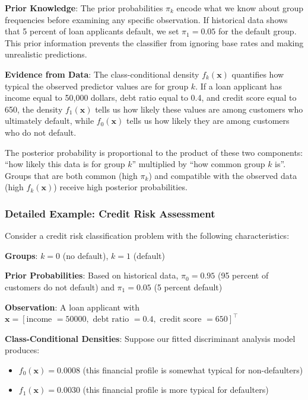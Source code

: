 \documentclass[
]{article}
\begin{document}
\textbf{Prior Knowledge}: The prior probabilities \(\pi_{k}\) encode
what we know about group frequencies before examining any specific
observation. If historical data shows that 5 percent of loan applicants
default, we set \(\pi_{1} = 0.05\) for the default group. This prior
information prevents the classifier from ignoring base rates and making
unrealistic predictions.

\textbf{Evidence from Data}: The class-conditional density
\(f_{k}\left( \mathbf{x} \right)\) quantifies how typical the observed
predictor values are for group \(k\). If a loan applicant has income
equal to 50,000 dollars, debt ratio equal to 0.4, and credit score equal
to 650, the density \(f_{1}\left( \mathbf{x} \right)\) tells us how
likely these values are among customers who ultimately default, while
\(f_{0}\left( \mathbf{x} \right)\) tells us how likely they are among
customers who do not default.

The posterior probability is proportional to the product of these two
components: ``how likely this data is for group \(k\)'' multiplied by
``how common group \(k\) is''. Groups that are both common (high
\(\pi_{k}\)) and compatible with the observed data (high
\(f_{k}\left( \mathbf{x} \right)\)) receive high posterior
probabilities.

\subsubsection{Detailed Example: Credit Risk Assessment}

Consider a credit risk classification problem with the following
characteristics:

\textbf{Groups}: \(k = 0\) (no default), \(k = 1\) (default)

\textbf{Prior Probabilities}: Based on historical data,
\(\pi_{0} = 0.95\) (95 percent of customers do not default) and
\(\pi_{1} = 0.05\) (5 percent default)

\textbf{Observation}: A loan applicant with
\(\mathbf{x} = \left\lbrack \text{income } = 50000,\text{ debt ratio } = 0.4,\text{ credit score } = 650 \right\rbrack^{\top}\)

\textbf{Class-Conditional Densities}: Suppose our fitted discriminant
analysis model produces:

\begin{itemize}
\item
  \(f_{0}\left( \mathbf{x} \right) = 0.0008\) (this financial profile is
  somewhat typical for non-defaulters)
\item
  \(f_{1}\left( \mathbf{x} \right) = 0.0030\) (this financial profile is
  more typical for defaulters)
\end{itemize}
\end{document}
